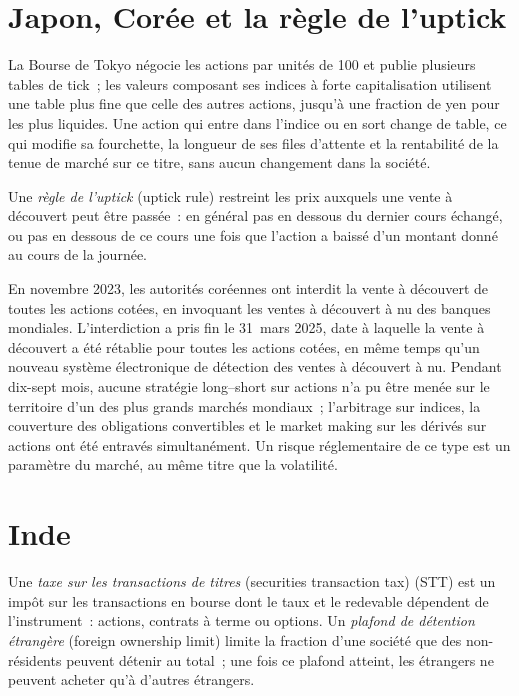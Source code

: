 \section{Japon, Corée et la règle de l'uptick}

La Bourse de Tokyo négocie les actions par unités de 100 et publie plusieurs tables
de tick~; les valeurs composant ses indices à forte capitalisation utilisent une table plus fine
que celle des autres actions, jusqu'à une fraction de yen pour les plus liquides. Une action qui
entre dans l'indice ou en sort change de table, ce qui modifie sa fourchette, la longueur de ses
files d'attente et la rentabilité de la tenue de marché sur ce titre, sans aucun changement
dans la société.

\begin{definition}\label{def:m1:asian-and-emerging-equity-markets:uptick}
Une \emph{règle de l'uptick} (uptick rule) restreint les prix auxquels une vente à découvert
peut être passée~: en général pas en dessous du dernier cours échangé, ou pas en dessous de ce cours
une fois que l'action a baissé d'un montant donné au cours de la journée.
\end{definition}

\begin{example}\label{ex:m1:asian-and-emerging-equity-markets:korea}
En novembre 2023, les autorités coréennes ont interdit la vente à découvert de toutes les actions cotées,
en invoquant les ventes à découvert à nu des banques mondiales. L'interdiction a pris fin le 31~mars
2025, date à laquelle la vente à découvert a été rétablie pour toutes les actions cotées, en même temps
qu'un nouveau système électronique de détection des ventes à découvert à nu. Pendant dix-sept mois,
aucune stratégie long--short sur actions n'a pu être menée sur le territoire d'un des plus grands marchés mondiaux~;
l'arbitrage sur indices, la couverture des obligations convertibles et le market making sur les dérivés sur actions ont été
entravés simultanément. Un risque réglementaire de ce type est un paramètre du marché, au même
titre que la volatilité.
\end{example}

\section{Inde}

\begin{definition}\label{def:m1:asian-and-emerging-equity-markets:stt}
Une \emph{taxe sur les transactions de titres} (securities transaction tax) (STT)
est un impôt sur les transactions en bourse dont le taux et le redevable dépendent de
l'instrument~: actions, contrats à terme ou options. Un
\emph{plafond de détention étrangère} (foreign ownership limit) limite la
fraction d'une société que des non-résidents peuvent détenir au total~; une fois ce plafond atteint, les
étrangers ne peuvent acheter qu'à d'autres étrangers.
\end{definition}

